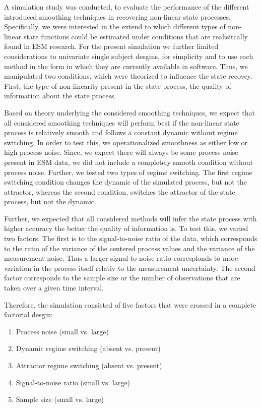 A simulation study was conducted, to evaluate the performance of the different 
introduced smoothing techniques in recovering non-linear state processes. 
Specifically, we were interested in the extend to which different types 
of non-linear state functions could be estimated under conditions that are 
realisitcally found in ESM research. For the present simulation we further 
limited considerations to univariate single subject desgins, for simplicity and 
to use each method in the form in which they are currently available in software.
Thus, we manipulated two 
conditions, which were theorized to influence the state recovey. First, the type 
of non-linearity present in the state process, the quality of information 
about the state process.

Based on theory underlying the considered smoothing techniques, we expect that 
all considered smoothing techniques will perform best if the non-linear state process 
is relatively smooth and follows a constant dynamic without regime switching. 
In order to test this, we operationalized smoothness as either low or high 
process noise. Since, we expect there will always be some process noise present 
in ESM data, we did not include a completely smooth condition without process noise. 
Further, we tested two types of regime switching. The first regime switching 
condition changes the dynamic of the simulated process, but not the attractor, 
whereas the second condition, switches the attractor of the state process, but not the 
dynamic. 

Further, we expected that all considered methods will infer the state process 
with higher accuracy the better the quality of information is. To test this, 
we varied two factors. The first is to the signal-to-noise ratio of the 
data, which corresponds to the ratio of the variance of the centered process values 
and the variance of the measurement noise. Thus a larger signal-to-noise ratio 
corresplonds to more variation in the process itself relativ to the measurement 
uncertainty. The second factor corresponds to the sample size or the 
number of observations that are taken over a given time interval. 

Therefore, the simulation consisted of five factors that were crossed in a complete 
factorial desgin: 

\begin{enumerate}
    \item Process noise (small vs. large)
    \item Dynamic regime switching (absent vs. present)
    \item Attractor regime switching (absent vs. present)
    \item Signal-to-noise ratio (small vs. large)
    \item Sample size (small vs. large)
\end{enumerate}
